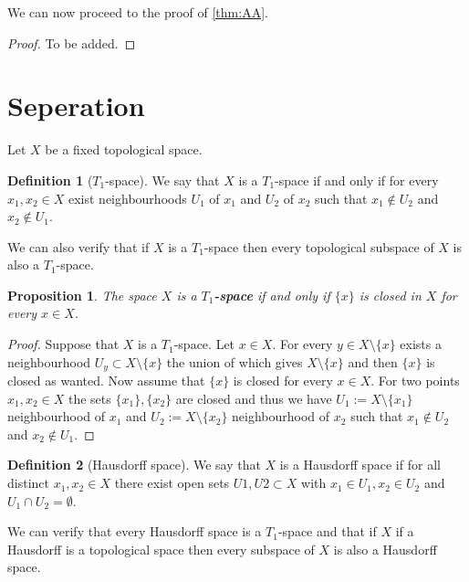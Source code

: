 \documentclass[11pt,a4paper]{article}
\theoremstyle{definition}
\newtheorem{definition}{Definition}[section]
\theoremstyle{plain}
\newtheorem{proposition}[theorem]{Proposition}
\begin{document}
  We can now proceed to the proof of \autoref{thm:AA}.

  \begin{proof}
    To be added.
  \end{proof}

  \newpage

  \section{Seperation}
  Let $X$ be a fixed topological space.

  \begin{definition}[$T_1$-space]
    We say that $X$ is a $T_1$-space if and only if for every
    $x_1, x_2 \in X$ exist neighbourhoods $U_1$ of $x_1$ and $U_2$ of
    $x_2$ such that $x_1 \notin U_2$ and $x_2 \notin U_1$.
  \end{definition}
  
  We can also verify that if $X$ is a $T_1$-space then every topological
  subspace of $X$ is also a $T_1$-space.
  
  \begin{proposition}
    The space $X$ is a $T_1$\textbf{-space} if and only if $\{x\}$ is 
    closed in $X$ for every $x \in X$.
  \end{proposition}
  \begin{proof}
    Suppose that $X$ is a $T_1$-space. Let $x \in X$. For every 
    $y \in X \setminus \{x\}$ exists a neighbourhood 
    $U_y \subset X \setminus \{x\}$ the union of which gives 
    $X \setminus \{x\}$ and then $\{x\}$ is closed as wanted. Now
    assume that $\{x\}$ is closed for every $x \in X$. For two points
    $x_1,x_2 \in X$ the sets $\{x_1\},\{x_2\}$ are closed and thus
    we have $U_1 := X \setminus \{x_1\}$ neighbourhood of $x_1$ and
    $U_2 := X \setminus \{x_2\}$ neighbourhood of $x_2$ such that
    $x_1 \notin U_2$ and $x_2 \notin U_1$.
  \end{proof}
  
  \begin{definition}[Hausdorff space]
    We say that $X$ is a Hausdorff space if for all distinct 
    $x_1, x_2 \in X$ there exist open sets $U1, U2 \subset X$ with 
    $x_1 \in U_1, x_2 \in U_2$ and $U_1 \cap U_2 = \emptyset$.
  \end{definition}
  
  We can verify that every Hausdorff space is a $T_1$-space and that if
  $X$ if a Hausdorff is a topological space then every subspace of $X$
  is also a Hausdorff space.
  
\end{document}
